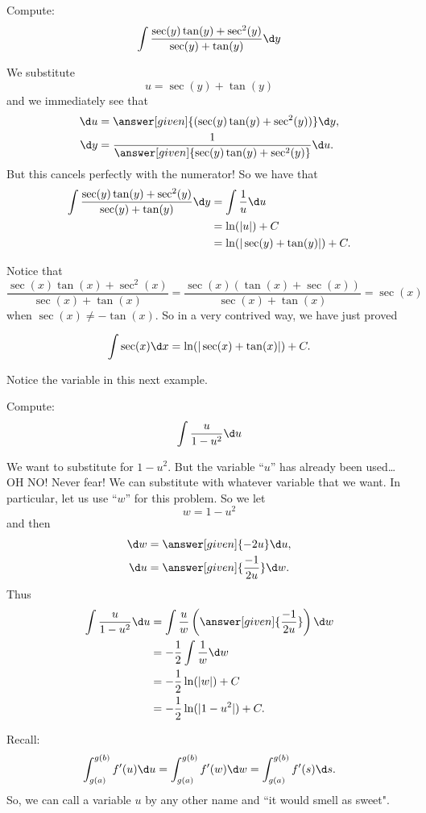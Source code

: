 \documentclass{ximera}
\begin{document}
\begin{example}
Compute:
\[
\int \frac{\sec(y) \tan(y) + \sec^2(y)}{\sec(y) + \tan(y)} \d y
\]
\begin{explanation}
We substitute
\[
u = \sec(y) + \tan(y)
\]
and we immediately see that
\begin{align*}
  \d u &= \answer[given]{(\sec(y) \tan(y) + \sec^2(y))} \d y,\\
  \d y &= \frac{1}{\answer[given]{\sec(y) \tan(y) + \sec^2(y)}} \d u.
\end{align*}
But this cancels perfectly with the numerator!  
So we have that
\begin{align*}
\int \frac{\sec(y) \tan(y) + \sec^2(y)}{\sec(y) + \tan(y)} \d y &= \int \frac{1}{u} \d u  \\
&= \ln(|u|) + C  \\
&= \ln(| \sec(y) + \tan(y) |) + C.
\end{align*}
\end{explanation}
\end{example}



Notice that 
\[
\frac{\sec(x) \tan(x) + \sec^2(x)}{\sec(x) + \tan(x)} = \frac{\sec(x) (\tan(x) + \sec(x))}{\sec(x) + \tan(x)} = \sec(x)
\]
when $\sec(x) \neq - \tan(x)$.  
So in a very contrived way, we have just proved

\begin{theorem}
\[
\int \sec(x) \d x = \ln(|\sec(x) + \tan(x)|) + C.
\]
\end{theorem}


Notice the variable in this next example.


\begin{example}\label{key example}
Compute:
\[
\int \frac{u}{1-u^2} \d u
\]
\begin{explanation}
We want to substitute for $1-u^2$.  
But the variable ``$u$'' has already been used\dots OH NO!
Never fear! We can substitute with whatever variable that we want.  
In particular, let us use ``$w$'' for this problem.  
So we let
\[
w = 1 - u^2
\]
and then
\begin{align*}
  \d w &= \answer[given]{-2u} \d u,\\
  \d u &= \answer[given]{\frac{-1}{2u}} \d w.
\end{align*}
Thus
\begin{align*}
\int \frac{u}{1-u^2} \d u &= \int \frac{u}{w} \left( \answer[given]{\frac{-1}{2u}} \right) \d w  \\
&= - \frac{1}{2} \int \frac{1}{w} \d w  \\
&= - \frac{1}{2} \ln(|w|) + C  \\
&= - \frac{1}{2} \ln(|1-u^2|) + C.
\end{align*}
\end{explanation}
Recall:
\[
\int_{g(a)}^{g(b)} f'(u) \d u=\int_{g(a)}^{g(b)} f'(w) \d w=\int_{g(a)}^{g(b)} f'(s) \d s.
\]
So, we can call a variable $u$ by any other name and ``it would smell as sweet".

\end{example}
\end{document}
